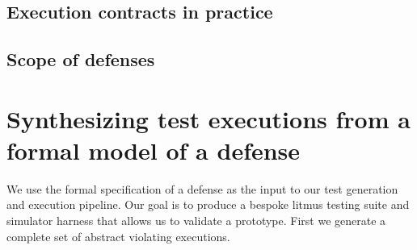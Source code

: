 \subsection{Execution contracts in practice}
\subsection{Scope of defenses}

  




\section{Synthesizing test executions from a formal model of a defense}
We use the \toolname formal specification of a defense as the input to our test generation and execution pipeline. Our goal is to produce a bespoke litmus testing suite and simulator harness that allows us to validate a prototype. First we generate a complete set of abstract violating executions.

